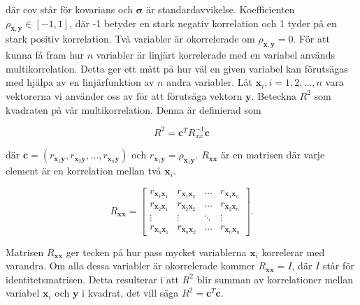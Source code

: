 \noindent
där cov står för kovarians och $\mathbf{\sigma}$ är standardavvikelse. Koefficienten $\rho_{\mathbf{x},\mathbf{y}} \in [-1,1]$, där -1 betyder en stark negativ korrelation och 1 tyder på en stark positiv korrelation. Två variabler är okorrelerade om $\rho_{\mathbf{x},\mathbf{y}} = 0$. För att kunna få fram hur $n$ variabler är linjärt korrelerade med en variabel används multikorrelation. Detta ger ett mått på hur väl en given variabel kan förutsägas med hjälpa av en linjärfunktion av $n$ andra variabler. Låt $\mathbf{x}_{i}, i = 1, 2, ..., n$ vara vektorerna vi använder oss av för att förutsäga vektorn $\mathbf{y}$. Beteckna $R^2$ som kvadraten på vår multikorrelation. Denna är definierad som 

\begin{equation}
    R^{2} = \mathbf{c}^{T}R_{xx}^{-1}\mathbf{c}
\end{equation}

\noindent
där $\mathbf{c} = (r_{\mathbf{x}_1\mathbf{y}}, r_{\mathbf{x}_2\mathbf{y}}, ..., r_{\mathbf{x}_n\mathbf{y}})$ och $r_{\mathbf{x}_1\mathbf{y}} = \rho_{\mathbf{x}_1\mathbf{y}}$. $R_{\mathbf{xx}}$ är en matrisen där varje element är en korrelation mellan två $\mathbf{x}_i$. 

 
\begin{equation}
    R_{\mathbf{xx}} = 
    \begin{bmatrix}
    r_{\mathbf{x}_1\mathbf{x}_1} & r_{\mathbf{x}_1\mathbf{x}_2} &  \dots  & r_{\mathbf{x}_1\mathbf{x}_n} \\
    r_{\mathbf{x}_2\mathbf{x}_1} & r_{\mathbf{x}_2\mathbf{x}_2} & \dots  & r_{\mathbf{x}_2\mathbf{x}_n} \\
    \vdots & \vdots  & \ddots & \vdots \\
    r_{\mathbf{x}_n\mathbf{x}_1} & r_{\mathbf{x}_n\mathbf{x}_2} & \dots  & r_{\mathbf{x}_n\mathbf{x}_n}
\end{bmatrix}.    
\end{equation}

\noindent
Matrisen $R_\mathbf{xx}$ ger tecken på hur pass mycket variablerna $\mathbf{x}_{i}$ korrelerar med varandra. Om alla dessa variabler är okorrelerade kommer $R_\mathbf{xx} = I$, där $I$ står för identitetsmatrisen. Detta resulterar i att $R^2$ blir summan av korrelationer mellan variabel $\mathbf{x}_{i}$ och $\mathbf{y}$ i kvadrat, det vill säga $R^2 = \mathbf{c}^{T}\mathbf{c}$.